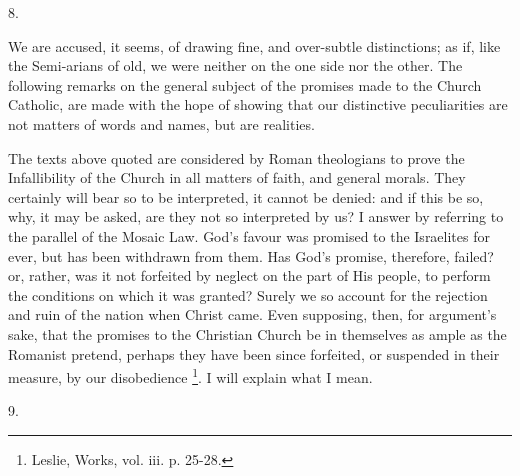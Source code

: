 8.

We are accused, it seems, of drawing fine, and over-subtle
distinctions; as if, like the Semi-arians of old, we were neither on
the one side nor the other. The following remarks on the general
subject of the promises made to the Church Catholic, are made with the
hope of showing that our distinctive peculiarities are not matters of
words and names, but are realities.

The texts above quoted are considered by Roman theologians to prove
the Infallibility of the Church in all matters of faith, and general
morals. They certainly will bear so to be interpreted, it cannot be
denied: and if this be so, why, it may be asked, are they not so
interpreted by us? I answer by referring to the parallel of the Mosaic
Law. God's favour was promised to the Israelites for ever, but has
been withdrawn from them. Has God's promise, therefore, failed? or,
rather, was it not forfeited by neglect on the part of His people, to
perform the conditions on which it was granted? Surely we so account
for the rejection and ruin of the nation when Christ came. Even
supposing, then, for argument's sake, that the promises to the
Christian Church be in themselves as ample as the Romanist pretend,
perhaps they have been since forfeited, or suspended in their measure,
by our disobedience \footnote{Leslie, Works, vol. iii. p. 25-28.}. I
will explain what I mean.

9.

